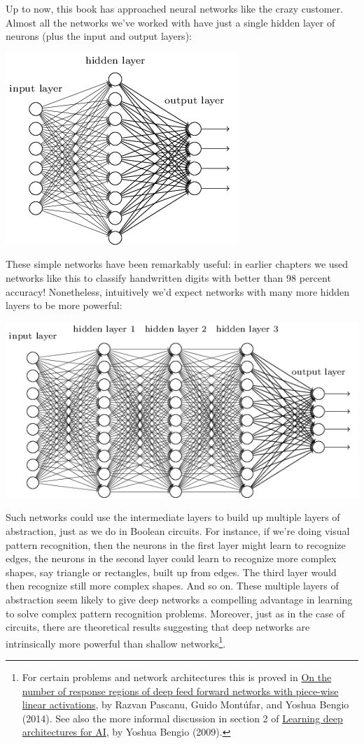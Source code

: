 \documentclass[a4paper,twoside,10pt]{book}
\begin{document}
Up to now, this book has approached neural networks like the crazy customer. Almost all the networks we've worked with have just a single hidden layer of neurons (plus the input and output layers):
\begin{center}
	\includegraphics[width=0.6\linewidth]{figures/ch5/tikz35}
\end{center}
These simple networks have been remarkably useful: in earlier chapters we used networks like this to classify handwritten digits with better than 98 percent accuracy! Nonetheless, intuitively we'd expect networks with many more hidden layers to be more powerful:
\begin{center}
	\includegraphics[width=\linewidth]{figures/ch5/tikz36}
\end{center}
Such networks could use the intermediate layers to build up multiple layers of abstraction, just as we do in Boolean circuits. For instance, if we're doing visual pattern recognition, then the neurons in the first layer might learn to recognize edges, the neurons in the second layer could learn to recognize more complex shapes, say triangle or rectangles, built up from edges. The third layer would then recognize still more complex shapes. And so on. These multiple layers of abstraction seem likely to give deep networks a compelling advantage in learning to solve complex pattern recognition problems. Moreover, just as in the case of circuits, there are theoretical results suggesting that deep networks are intrinsically more powerful than shallow networks\footnote{For certain problems and network architectures this is proved in \href{http://arxiv.org/pdf/1312.6098.pdf}{On the number of response regions of deep feed forward networks with piece-wise linear activations}, by Razvan Pascanu, Guido Mont\'ufar, and Yoshua Bengio (2014). See also the more informal discussion in section 2 of \href{http://www.iro.umontreal.ca/~bengioy/papers/ftml_book.pdf}{Learning deep architectures for AI}, by Yoshua Bengio (2009).}.
\end{document}
